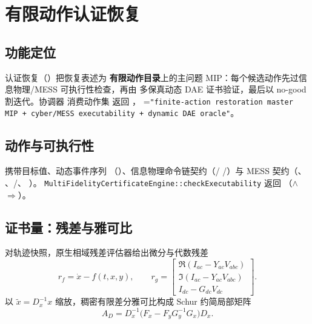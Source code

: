 \section{有限动作认证恢复}\label{sec:res-certified}

\subsection{功能定位}
认证恢复（）把恢复表述为
\textbf{有限动作目录}上的主问题 MIP：每个候选动作先过信息物理/MESS 可执行性检查，再由
多保真动态 DAE 证书验证，最后以 no-good 割迭代。协调器
 消费动作集
 返回 ，
=\texttt{"finite-action restoration master MIP + cyber/MESS executability + dynamic DAE oracle"}。

\subsection{动作与可执行性}
 携带目标值、动态事件序列
（）、信息物理命令链契约（/
/）与 MESS 契约（、
、/、
）。
\texttt{MultiFidelity\allowbreak Certificate\allowbreak Engine::checkExecutability}
返回 （$\wedge$$\Rightarrow$）。

\subsection{证书量：残差与雅可比}
对轨迹快照，原生相域残差评估器给出微分与代数残差
\begin{equation}
r_f=\dot x-f(t,x,y),\qquad
r_g=\begin{bmatrix}\Re(I_{ac}-Y_{ac}V_{abc})\\ \Im(I_{ac}-Y_{ac}V_{abc})\\ I_{dc}-G_{dc}V_{dc}\end{bmatrix}.
\end{equation}
以 $\widetilde x=D_x^{-1}x$ 缩放，稠密有限差分雅可比构成 Schur 约简局部矩阵
\begin{equation}
A_D=D_x^{-1}\big(F_x-F_yG_y^{-1}G_x\big)D_x.
\end{equation}

